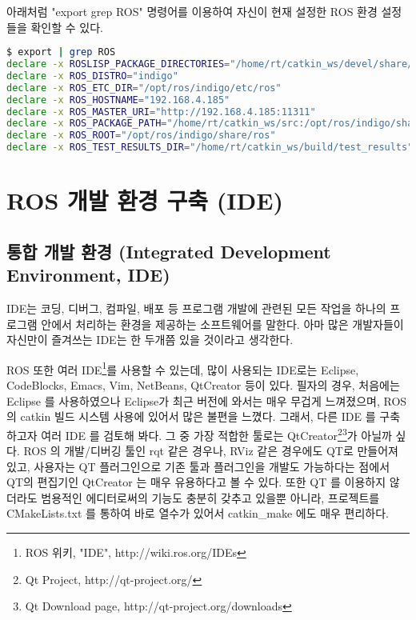 \begin{exercise}[ROS 환경 설정 확인 방법]
아래처럼 "export \textbar grep ROS" 명령어를 이용하여 자신이 현재 설정한 ROS 환경 설정들을 확인할 수 있다.

\begin{lstlisting}[language=bash, backgroundcolor=\color{ocre!10}, numbers=none]
$ export | grep ROS
declare -x ROSLISP_PACKAGE_DIRECTORIES="/home/rt/catkin_ws/devel/share/common-lisp"
declare -x ROS_DISTRO="indigo"
declare -x ROS_ETC_DIR="/opt/ros/indigo/etc/ros"
declare -x ROS_HOSTNAME="192.168.4.185"
declare -x ROS_MASTER_URI="http://192.168.4.185:11311"
declare -x ROS_PACKAGE_PATH="/home/rt/catkin_ws/src:/opt/ros/indigo/share:/opt/ros/indigo/stacks"
declare -x ROS_ROOT="/opt/ros/indigo/share/ros"
declare -x ROS_TEST_RESULTS_DIR="/home/rt/catkin_ws/build/test_results"
\end{lstlisting}
\end{exercise}

\section{ROS 개발 환경 구축 (IDE)}

\subsection{통합 개발 환경 (Integrated Development Environment, IDE)}

IDE는 코딩, 디버그, 컴파일, 배포 등 프로그램 개발에 관련된 모든 작업을 하나의 프로그램 안에서 처리하는 환경을 제공하는 소프트웨어를 말한다. 아마 많은 개발자들이 자신만이 즐겨쓰는 IDE는 한 두개쯤 있을 것이라고 생각한다. 

ROS 또한 여러 IDE\footnote{ROS 위키, "IDE", http://wiki.ros.org/IDEs}를 사용할 수 있는데, 많이 사용되는 IDE로는 Eclipse, CodeBlocks, Emacs, Vim, NetBeans, QtCreator 등이 있다. 필자의 경우, 처음에는 Eclipse 를 사용하였으나 Eclipse가 최근 버전에 와서는 매우 무겁게 느껴졌으며, ROS의 catkin 빌드 시스템 사용에 있어서 많은 불편을 느꼈다. 그래서, 다른 IDE 를 구축하고자 여러 IDE 를 검토해 봐다. 그 중 가장 적합한 툴로는 QtCreator\footnote{Qt Project, http://qt-project.org/}\footnote{Qt Download page, http://qt-project.org/downloads}가 아닐까 싶다. ROS 의 개발/디버깅 툴인 rqt 같은 경우나, RViz 같은 경우에도 QT로 만들어져 있고, 사용자는 QT 플러그인으로 기존 툴과 플러그인을 개발도 가능하다는 점에서 QT의 편집기인 QtCreator 는 매우 유용하다고 볼 수 있다. 또한 QT 를 이용하지 않더라도 범용적인 에디터로써의 기능도 충분히 갖추고 있을뿐 아니라, 프로젝트를 CMakeLists.txt 를 통하여 바로 열수가 있어서 catkin\_make 에도 매우 편리하다.

